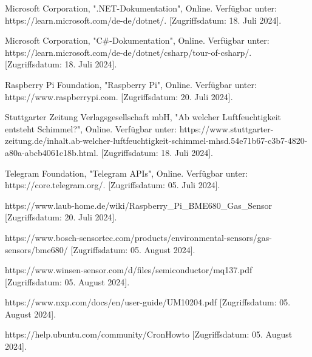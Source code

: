 \documentclass[conference]{IEEEtran}
\begin{document}
\begin{thebibliography}{00}
Microsoft Corporation, ".NET-Dokumentation", Online. Verfügbar unter: https://learn.microsoft.com/de-de/dotnet/. [Zugriffsdatum: 18. Juli 2024].

Microsoft Corporation, "C\#-Dokumentation", Online. Verfügbar unter: https://learn.microsoft.com/de-de/dotnet/csharp/tour-of-csharp/. [Zugriffsdatum: 18. Juli 2024].

Raspberry Pi Foundation, "Raspberry Pi", Online. Verfügbar unter: https://www.raspberrypi.com. [Zugriffsdatum: 20. Juli 2024].

Stuttgarter Zeitung Verlagsgesellschaft mbH, "Ab welcher Luftfeuchtigkeit entsteht Schimmel?", Online. Verfügbar unter: https://www.stuttgarter-zeitung.de/inhalt.ab-welcher-luftfeuchtigkeit-schimmel-mhsd.54e71b67-c3b7-4820-a80a-abcb4061c18b.html. [Zugriffsdatum: 18. Juli 2024].

Telegram Foundation, "Telegram APIs", Online. Verfügbar unter: https://core.telegram.org/. [Zugriffsdatum: 05. Juli 2024].

https://www.laub-home.de/wiki/Raspberry\_Pi\_BME680\_Gas\_Sensor [Zugriffsdatum: 20. Juli 2024].

https://www.bosch-sensortec.com/products/environmental-sensors/gas-sensors/bme680/ [Zugriffsdatum: 05. August 2024].

https://www.winsen-sensor.com/d/files/semiconductor/mq137.pdf [Zugriffsdatum: 05. August 2024].

https://www.nxp.com/docs/en/user-guide/UM10204.pdf [Zugriffsdatum: 05. August 2024].

https://help.ubuntu.com/community/CronHowto [Zugriffsdatum: 05. August 2024].

\end{thebibliography}
\end{document}
